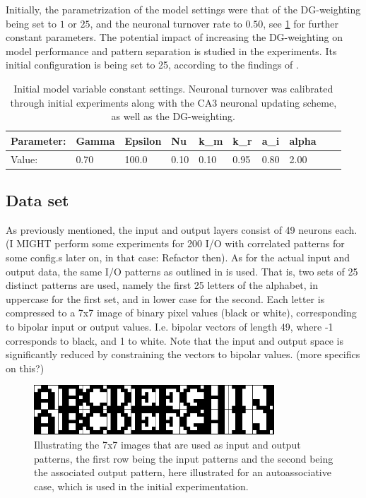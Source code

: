 Initially, the parametrization of the model settings were that of the DG-weighting being set to $1$ or $25$, and the neuronal turnover rate to $0.50$, see \ref{table:initial_settings} for further constant parameters. The potential impact of increasing the DG-weighting on model performance and pattern separation is studied in the experiments. Its initial configuration is being set to 25, according to the findings of \citep{Wakagi2008}.

\begin{table}
\centering
\caption{Initial model variable constant settings. Neuronal turnover was calibrated through initial experiments along with the CA3 neuronal updating scheme, as well as the DG-weighting.}
\label{table:initial_settings}
\begin{tabular}{|l|l|l|l|l|l|l|l|l|l|}
\cline{1-8}
Parameter: & Gamma & Epsilon & Nu   & k\_m & k\_r & a\_i & alpha \\ \hline
Value:     & 0.70  & 100.0   & 0.10 & 0.10 & 0.95 & 0.80 & 2.00 \\ \hline
\end{tabular}
\end{table}

\subsection{Data set}
As previously mentioned, the input and output layers consist of 49 neurons each. (I MIGHT perform some experiments for 200 I/O with correlated patterns for some config.s later on, in that case: Refactor then). As for the actual input and output data, the same I/O patterns as outlined in \citep{Hattori2010, Hattori2014} is used. That is, two sets of 25 distinct patterns are used, namely the first 25 letters of the alphabet, in uppercase for the first set, and in lower case for the second. Each letter is compressed to a 7x7 image of binary pixel values (black or white), corresponding to bipolar input or output values. I.e. bipolar vectors of length 49, where -1 corresponds to black, and 1 to white. Note that the input and output space is significantly reduced by constraining the vectors to bipolar values. (more specifics on this?)

\begin{figure}\label{fig:sample_letters}
    \centering
    \includegraphics[width=9cm]{fig/im_both.png}
    \caption{Illustrating the 7x7 images that are used as input and output patterns, the first row being the input patterns and the second being the associated output pattern, here illustrated for an autoassociative case, which is used in the initial experimentation.}
\end{figure}


